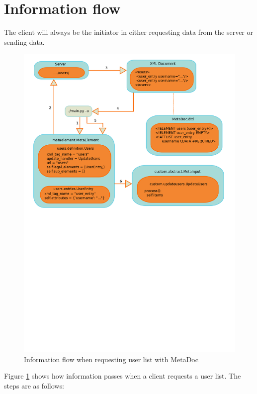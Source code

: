 \newpage
\section{Information flow}

The client will always be the initiator in either requesting data from the
server or sending data. 

\begin{figure}[h!]
    \includegraphics[width=\textwidth]{img/xml_flow}
    \caption{Information flow when requesting user list with MetaDoc}
    \label{fig:information_flow}
\end{figure}

Figure \ref{fig:information_flow} shows how information passes when a client
requests a user list. The steps are as follows:

